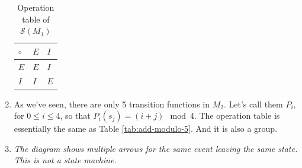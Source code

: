 \begin{enumerate}
    \begin{table}[!ht]
        \centering
        \begin{tabular}{l|ll}
        $\circ$ & $E$ & $I$ \\ \hline
        $E$     & $E$ & $I$ \\
        $I$     & $I$ & $E$
        \end{tabular}
        \caption{Operation table of $\mathscr{S}(M_1)$}
        \label{tab:op-semigroup-m1}
    \end{table}
    
    \item As we've seen, there are only 5 transition functions in $M_2$. Let's call them $P_i$, for $0 \leqslant i \leqslant 4$, so that $P_i(s_j) = (i + j) \mod 4$. The operation table is essentially the same as Table \ref{tab:add-modulo-5}. And it is also a group.

    \item \emph{The diagram shows multiple arrows for the same event leaving the same state. This is not a state machine.}
\end{enumerate}

